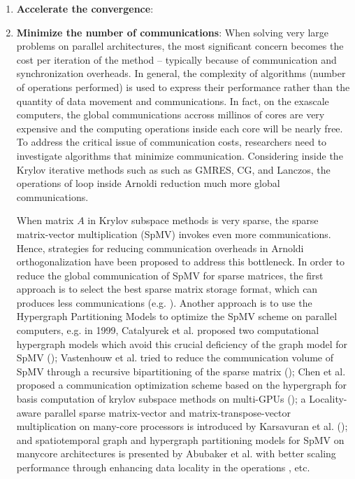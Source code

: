 \begin{enumerate}
	
	\item \textbf{Accelerate the convergence}:
	
	\item \textbf{Minimize the number of communications}: When solving very large problems on parallel architectures, the most significant concern becomes the cost per iteration of the method -- typically because of communication and synchronization overheads. In general, the complexity of algorithms (number of operations performed) is used to express their performance rather than the quantity of data movement and communications. In fact, on the exascale computers, the global communications accross millinos of cores are very expensive and the computing operations inside each core will be nearly free. To address the critical issue of communication costs, researchers need to investigate algorithms that minimize communication. Considering inside the Krylov iterative methods such as such as GMRES, CG, and Lanczos, the operations of loop inside Arnoldi reduction much more global communications. 
	
	When matrix $A$ in Krylov subspace methods is very sparse, the sparse matrix-vector multiplication (SpMV) invokes even more communications. Hence, strategies for reducing communication overheads in Arnoldi orthogonalization have been proposed to address this bottleneck. In order to reduce the global communication of SpMV for sparse matrices, the first approach is to select the best sparse matrix storage format, which can produces less communications (e.g. \cite{montagne2004optimal, liu2015csr5,stathis2003hierarchical,merrill2016merge,bell2008efficient, bell2009implementing,kreutzer2014unified,ashari2014efficient}). Another approach is to use the Hypergraph Partitioning Models to optimize the SpMV scheme on parallel computers, e.g. in 1999, Catalyurek et al. proposed two computational hypergraph models which avoid this crucial deficiency of the graph model for SpMV (\cite{catalyurek1999hypergraph}); Vastenhouw et al. tried to reduce the communication volume of SpMV through a recursive bipartitioning of the sparse matrix (\cite{vastenhouw2005two}); Chen et al. proposed a communication optimization scheme based on the hypergraph for basis computation of krylov subspace methods on multi-GPUs (\cite{chen2014communication}); a Locality-aware parallel sparse matrix-vector and matrix-transpose-vector multiplication on many-core processors is introduced by Karsavuran et al. (\cite{karsavuran2016locality}); and spatiotemporal graph and hypergraph partitioning models for SpMV on manycore architectures is presented by Abubaker et al. with better scaling performance through enhancing data locality in the operations \cite{abubaker2018spatiotemporal}, etc.
	

\end{enumerate}

